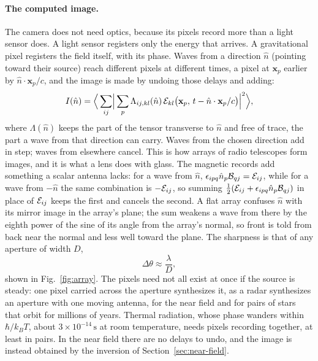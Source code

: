 \paragraph{The computed image.} The camera does not need optics, because its
pixels record more than a light sensor does. A light sensor registers only
the energy that arrives. A gravitational pixel registers the field itself,
with its phase. Waves from a direction $\hat n$ (pointing toward their source)
reach different pixels at different times, a pixel at $\mathbf{x}_p$ earlier
by $\hat n\cdot\mathbf{x}_p/c$, and the
image is made by undoing those delays and adding:
\begin{equation}\label{eq:beam}
I(\hat n) = \Bigl\langle\, \sum_{ij}\Bigl|\, \sum_{p} \Lambda_{ij,kl}(\hat n)\,
\mathcal{E}_{kl}\bigl(\mathbf{x}_p,\, t -\hat n\cdot\mathbf{x}_p/c\bigr) \Bigr|^{2}
\Bigr\rangle ,
\end{equation}
where $\Lambda(\hat n)$ keeps
the part of the tensor transverse to $\hat n$ and free of trace, the part a
wave from that direction can carry. Waves from the chosen
direction add in step; waves from elsewhere cancel. This is how arrays of
radio telescopes form images, and it is what a lens does with glass. The
magnetic records add something a scalar antenna lacks: for a wave from $\hat
n$, $\epsilon_{ipq}\hat n_p\mathcal{B}_{qj} = \mathcal{E}_{ij}$, while for a wave from $-\hat
n$ the same combination is $-\mathcal{E}_{ij}$, so summing $\tfrac12(\mathcal{E}_{ij} +
\epsilon_{ipq}\hat n_p\mathcal{B}_{qj})$ in place of $\mathcal{E}_{ij}$ keeps the first and
cancels the second. A flat array confuses $\hat n$ with its mirror image in the
array's plane; the sum weakens a wave from there by the eighth power of the sine
of its angle from the array's normal, so front is told from back near the normal
and less well toward the plane. The
sharpness is that of any aperture of width $D$,
\begin{equation}\label{eq:diffraction}
\Delta\theta \approx \frac{\lambda}{D} ,
\end{equation}
shown in Fig.~\ref{fig:array}. The pixels need not all exist at once if the
source is steady: one pixel carried across the aperture synthesizes it, as
a radar synthesizes an aperture with one moving antenna, for the near field and
for pairs of stars that orbit for millions of years. Thermal radiation, whose
phase wanders within $\hbar/k_BT$, about $3\times10^{-14}\,\mathrm{s}$ at room
temperature, needs pixels recording together, at least in pairs. In the near field there are
no delays to undo, and the image is instead obtained by the inversion of
Section~\ref{sec:near-field}.


